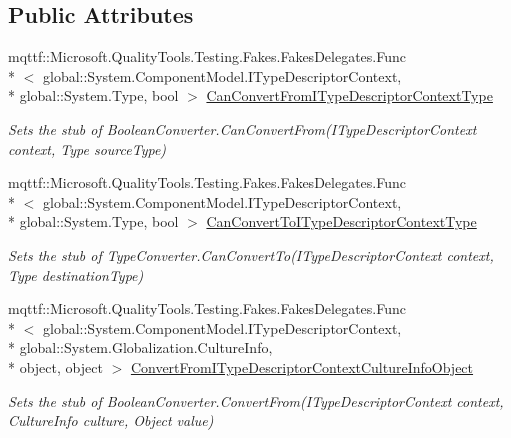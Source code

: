 \subsection*{Public Attributes}
\begin{DoxyCompactItemize}
\item 
mqttf\-::\-Microsoft.\-Quality\-Tools.\-Testing.\-Fakes.\-Fakes\-Delegates.\-Func\\*
$<$ global\-::\-System.\-Component\-Model.\-I\-Type\-Descriptor\-Context, \\*
global\-::\-System.\-Type, bool $>$ \hyperlink{class_system_1_1_component_model_1_1_fakes_1_1_stub_boolean_converter_a4645edabd91df33c738fcf45414d7204}{Can\-Convert\-From\-I\-Type\-Descriptor\-Context\-Type}
\begin{DoxyCompactList}\small\item\em Sets the stub of Boolean\-Converter.\-Can\-Convert\-From(\-I\-Type\-Descriptor\-Context context, Type source\-Type)\end{DoxyCompactList}\item 
mqttf\-::\-Microsoft.\-Quality\-Tools.\-Testing.\-Fakes.\-Fakes\-Delegates.\-Func\\*
$<$ global\-::\-System.\-Component\-Model.\-I\-Type\-Descriptor\-Context, \\*
global\-::\-System.\-Type, bool $>$ \hyperlink{class_system_1_1_component_model_1_1_fakes_1_1_stub_boolean_converter_a0fbe1e8271f6dcbea8e4ae6013c54a2f}{Can\-Convert\-To\-I\-Type\-Descriptor\-Context\-Type}
\begin{DoxyCompactList}\small\item\em Sets the stub of Type\-Converter.\-Can\-Convert\-To(\-I\-Type\-Descriptor\-Context context, Type destination\-Type)\end{DoxyCompactList}\item 
mqttf\-::\-Microsoft.\-Quality\-Tools.\-Testing.\-Fakes.\-Fakes\-Delegates.\-Func\\*
$<$ global\-::\-System.\-Component\-Model.\-I\-Type\-Descriptor\-Context, \\*
global\-::\-System.\-Globalization.\-Culture\-Info, \\*
object, object $>$ \hyperlink{class_system_1_1_component_model_1_1_fakes_1_1_stub_boolean_converter_a4aa398dc2f4adc9a67402ee70ca76719}{Convert\-From\-I\-Type\-Descriptor\-Context\-Culture\-Info\-Object}
\begin{DoxyCompactList}\small\item\em Sets the stub of Boolean\-Converter.\-Convert\-From(\-I\-Type\-Descriptor\-Context context, Culture\-Info culture, Object value)\end{DoxyCompactList}\item 

\end{DoxyCompactItemize}
